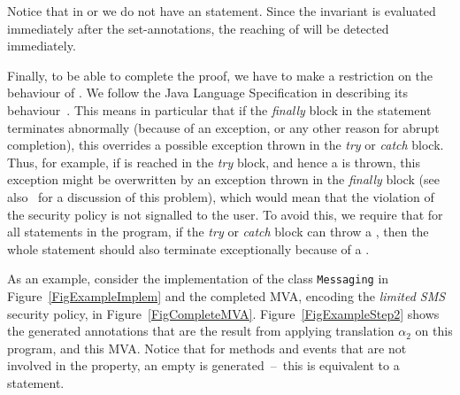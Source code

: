 Notice that in \postset or \excset we do not have an \Assert
statement. Since the invariant is evaluated immediately after the
set-annotations, the reaching of \halted will be detected immediately.

Finally, to be able to complete the proof, we have to make a
restriction on the behaviour of \TryCatch. We follow the Java Language
Specification in describing its behaviour~\cite{GoslingJSB05}. This
means in particular that if the \emph{finally} block in the statement
terminates abnormally (because of an exception, or any other reason
for abrupt completion), this overrides a possible exception thrown in
the \emph{try} or \emph{catch} block. Thus, for example, if \halted
is reached in the \emph{try} block, and hence a \JMLExc is thrown, this
exception might be overwritten by an exception thrown in the
\emph{finally} block (see also~\cite{Huisman08} for a discussion of
this problem), which would mean that the violation of the security
policy is not signalled to the user. To avoid this, we require that
for all \TryCatch statements in the program, if the \emph{try} or
\emph{catch} block can throw a \JMLExc, then the whole statement
should also terminate exceptionally because of a \JMLExc.



As an example, consider the implementation of the class \texttt{Messaging}
in Figure~\ref{FigExampleImplem} and the completed MVA, encoding the
\emph{limited SMS} security policy, in
Figure~\ref{FigCompleteMVA}. Figure~\ref{FigExampleStep2} shows the
generated annotations that are the result from applying translation
\(\alpha_2\) on this program, and this MVA. Notice that for methods
and events that are not involved in the property, an empty \CaseJML is
generated~--~this is equivalent to a \Skip statement.


